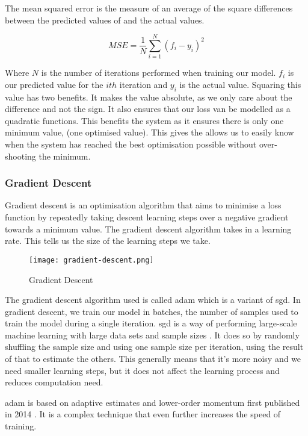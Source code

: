 The mean squared error is the measure of an average of the square differences between the predicted values of and the actual values.

\begin{equation} \label{eqn:mseLossFunction}
    MSE = \frac{1}{N}\sum_{i=1}^{N}{({f_i}-{y_i})}^2 
\end{equation}

Where $N$ is the number of iterations performed when training our model. $f_i$ is our predicted value for the $ith$ iteration and $y_i$ is the actual value. Squaring this value has two benefits. It makes the value absolute, as we only care about the difference and not the sign. It also ensures that our loss van be modelled as a quadratic functions. This benefits the system as it ensures there is only one minimum value, (one optimised value). This gives the allows us to easily know when the system has reached the best optimisation possible without over-shooting the minimum.

\subsubsection{Gradient Descent}
Gradient descent is an optimisation algorithm that aims to minimise a loss function by repeatedly taking descent learning steps over a negative gradient towards a minimum value. The gradient descent algorithm takes in a learning rate. This tells us the size of the learning steps we take. 

\begin{figure}[ht]
    \centering
    \texttt{[image: gradient-descent.png]}
    \caption{Gradient Descent \cite{gradientDescent}}
    \label{fig:gradientDescent}
\end{figure}

The gradient descent algorithm used is called \acrfull{adam} which is a variant of \acrfull{sgd}. In gradient descent, we train our model in batches, the number of samples used to train the model during a single iteration. \acrshort{sgd} is a way of performing large-scale machine learning with large data sets and sample sizes \cite{bottou2010large}. It does so by randomly shuffling the sample size and using one sample size per iteration, using the result of that to estimate the others. This generally means that it's more noisy and we need smaller learning steps, but it does not affect the learning process and reduces computation need.

\acrshort{adam} is based on adaptive estimates and lower-order momentum first published in 2014 \cite{kingma2014adam}. It is a complex technique that even further increases the speed of training.

